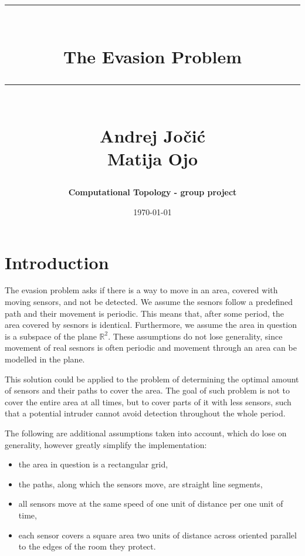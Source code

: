 \documentclass{article}
\makeatletter
\newcommand{\HRule}[1]{\rule{\linewidth}{#1}}
\renewcommand{\maketitle}{%
  \begin{center}
    \vspace*{3cm} %
    {\LARGE\@author\par}
    \vspace{1cm} %
    {\Huge\bfseries\@title\par}
    \vspace{2cm} %
    {\Large\@date\par}
  \end{center}
}
\makeatother
\begin{document}
\title{ \normalsize \textsc{}
\\ [0.5cm]
\HRule{1.0pt} \\
\Huge \textbf{The Evasion Problem}
\HRule{1.0pt}
\\ [1.5cm]
\LARGE{Andrej Jočić \\ Matija Ojo}
}
\author{\textbf{Computational Topology - group project}}
\date{\today}

\maketitle

\newpage


\section{Introduction}

The evasion problem asks if there is a way to move in an area, covered with moving sensors, and not be detected.
We assume the sesnors follow a predefined path and their movement is periodic.
This means that, after some period, the area covered by sesnors is identical.
Furthermore, we assume the area in question is a subspace of the plane $ \mathbb{R}^2 $.
These assumptions do not lose generality, since movement of real sesnors is often periodic and movement through an area can be modelled in the plane.

This solution could be applied to the problem of determining the optimal amount of sensors and their paths to cover the area.
The goal of such problem is not to cover the entire area at all times, but to cover parts of it with less sensors, such that a potential intruder cannot avoid detection throughout the whole period.

The following are additional assumptions taken into account, which do lose on generality, however greatly simplify the implementation:
\begin{itemize}
  \item the area in question is a rectangular grid,
  \item the paths, along which the sensors move, are straight line segments,
  \item all sensors move at the same speed of one unit of distance per one unit of time,
  \item each sensor covers a square area two units of distance across oriented parallel to the edges of the room they protect.
\end{itemize}
\end{document}

